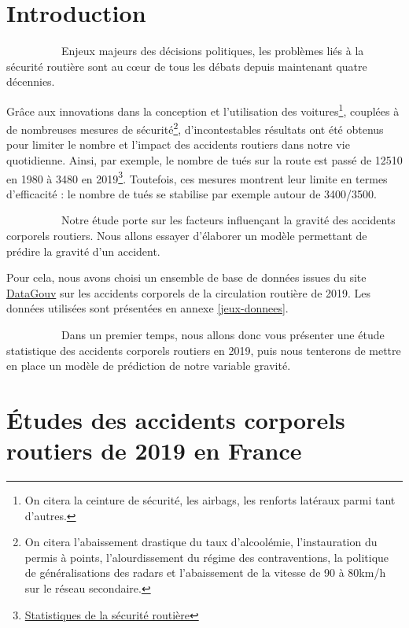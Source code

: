 \documentclass[french,]{tp}
\let\rmarkdownfootnote\footnote%
\def\footnote{\protect\rmarkdownfootnote}
\begin{document}
\newpage

\hypertarget{introduction}{%
\section{Introduction}\label{introduction}}

~~~~~~~~~~Enjeux majeurs des décisions politiques, les problèmes liés à la sécurité routière sont au cœur de tous les débats depuis maintenant quatre décennies.

Grâce aux innovations dans la conception et l'utilisation des voitures\footnote{On citera la ceinture de sécurité, les airbags, les renforts latéraux parmi tant d'autres.}, couplées à de nombreuses mesures de sécurité\footnote{On citera l'abaissement drastique du taux d'alcoolémie, l'instauration du permis à points, l'alourdissement du régime des contraventions, la politique de généralisations des radars et l'abaissement de la vitesse de 90 à 80km/h sur le réseau secondaire.}, d'incontestables résultats ont été obtenus pour limiter le nombre et l'impact des accidents routiers dans notre vie quotidienne. Ainsi, par exemple, le nombre de tués sur la route est passé de 12510 en 1980 à 3480 en 2019\footnote{\href{http://www.securite-routiere.org/Fiches/statistiques/statfr.htm}{Statistiques de la sécurité routière}}. Toutefois, ces mesures montrent leur limite en termes d'efficacité : le nombre de tués se stabilise par exemple autour de 3400/3500.

~~~~~~~~~~Notre étude porte sur les facteurs influençant la gravité des accidents corporels routiers. Nous allons essayer d'élaborer un modèle permettant de prédire la gravité d'un accident.

Pour cela, nous avons choisi un ensemble de base de données issues du site \href{https://www.data.gouv.fr/fr/datasets/bases-de-donnees-annuelles-des-accidents-corporels-de-la-circulation-routiere-annees-de-2005-a-2019/}{DataGouv} sur les accidents corporels de la circulation routière de 2019. Les données utilisées sont présentées en annexe \ref{jeux-donnees}.

~~~~~~~~~~Dans un premier temps, nous allons donc vous présenter une étude statistique des accidents corporels routiers en 2019, puis nous tenterons de mettre en place un modèle de prédiction de notre variable gravité.

\hypertarget{uxe9tudes-des-accidents-corporels-routiers-de-2019-en-france}{%
\section{Études des accidents corporels routiers de 2019 en France}\label{uxe9tudes-des-accidents-corporels-routiers-de-2019-en-france}}
\end{document}
